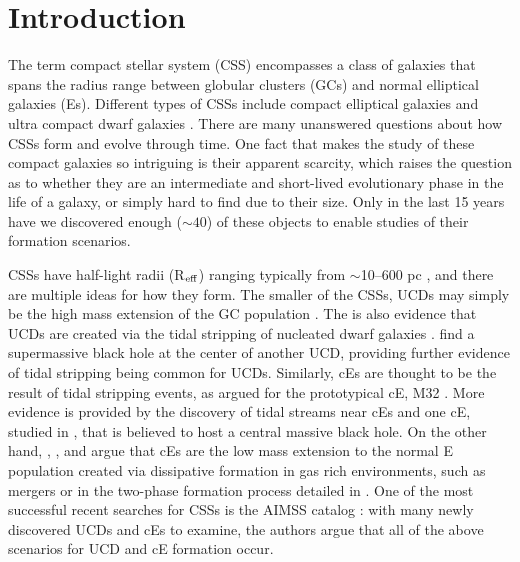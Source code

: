 \documentclass[iop,apj]{emulateapj}
\newcommand{\Reff}{R$_{\rm eff}$}
\begin{document}
\section{Introduction}
\label{intro}

  The term compact stellar system (CSS) encompasses a class of galaxies that spans the radius range between globular clusters (GCs) and normal elliptical galaxies (Es). Different types of CSSs include compact elliptical galaxies \citep[cEs;][]{Faber1973} and ultra compact dwarf galaxies \citep[UCDs;][]{Phillipps2001}. There are many unanswered questions about how CSSs form and evolve through time. One fact that makes the study of these compact galaxies so intriguing is their apparent scarcity, which raises the question as to whether they are an intermediate and short-lived evolutionary phase in the life of a galaxy, or simply hard to find due to their size. Only in the last 15 years have we discovered enough ($\sim 40$) of these objects to enable studies of their formation scenarios.

CSSs have half-light radii (\Reff) ranging typically from $\sim$10--600 pc \citep[e.g.,][]{Norris2014}, and there are multiple ideas for how they form. The smaller of the CSSs, UCDs may simply be the high mass extension of the GC population \citep{Drinkwater2000, Mieske2002}. The is also evidence that UCDs are created via the tidal stripping of nucleated dwarf galaxies \citep{Bekki2001, Bekki2003, Jennings2015, Zhang2015}. \citet{Seth2014} find a supermassive black hole at the center of another UCD, providing further evidence of tidal stripping being common for UCDs. Similarly, cEs are thought to be the result of tidal stripping events, as argued for the prototypical cE, M32 \citep{Choi2002, Graham2002, Huxor2011}. More evidence is provided by the discovery of tidal streams near cEs \citep{SmithCastelli2008a,Chilingarian2009} and one cE, studied in \citet{Kormendy1997}, that is believed to host a central massive black hole. On the other hand, \citet{Wirth1984}, \citet{Kormendy2009}, and \citet{Kormendy2012a} argue that cEs are the low mass extension to the normal E population created via dissipative formation in gas rich environments, such as mergers or in the two-phase formation process detailed in \citet{Oser2010}. One of the most successful recent searches for CSSs is the AIMSS catalog \citep{Norris2014}: with many newly discovered UCDs and cEs to examine, the authors argue that all of the above scenarios for UCD and cE formation occur.
\end{document}
